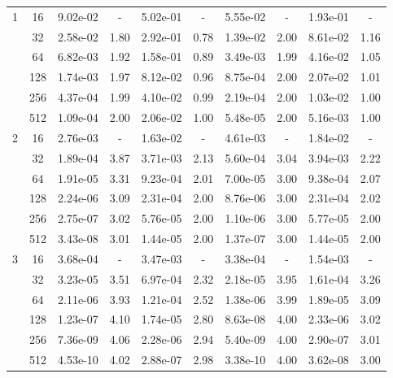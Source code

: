 \begin{table}[htbp]
\begin{center}
\begin{tabular}{| c | c | c c | c c | c c | c c |}
			\hline

			1	& 16 & 9.02e-02 & - & 5.02e-01 & - & 5.55e-02 & - & 1.93e-01 & - \\
				& 32 & 2.58e-02 & 1.80 & 2.92e-01 & 0.78 & 1.39e-02 & 2.00 & 8.61e-02 & 1.16 \\
				& 64 & 6.82e-03 & 1.92 & 1.58e-01 & 0.89 & 3.49e-03 & 1.99 & 4.16e-02 & 1.05 \\
				& 128 & 1.74e-03 & 1.97 & 8.12e-02 & 0.96 & 8.75e-04 & 2.00 & 2.07e-02 & 1.01 \\
				& 256 & 4.37e-04 & 1.99 & 4.10e-02 & 0.99 & 2.19e-04 & 2.00 & 1.03e-02 & 1.00 \\
				& 512 & 1.09e-04 & 2.00 & 2.06e-02 & 1.00 & 5.48e-05 & 2.00 & 5.16e-03 & 1.00 \\

			\hline

			2	& 16 & 2.76e-03 & - & 1.63e-02 & - & 4.61e-03 & - & 1.84e-02 & - \\
				& 32 & 1.89e-04 & 3.87 & 3.71e-03 & 2.13 & 5.60e-04 & 3.04 & 3.94e-03 & 2.22 \\
				& 64 & 1.91e-05 & 3.31 & 9.23e-04 & 2.01 & 7.00e-05 & 3.00 & 9.38e-04 & 2.07 \\
				& 128 & 2.24e-06 & 3.09 & 2.31e-04 & 2.00 & 8.76e-06 & 3.00 & 2.31e-04 & 2.02 \\
				& 256 & 2.75e-07 & 3.02 & 5.76e-05 & 2.00 & 1.10e-06 & 3.00 & 5.77e-05 & 2.00 \\
				& 512 & 3.43e-08 & 3.01 & 1.44e-05 & 2.00 & 1.37e-07 & 3.00 & 1.44e-05 & 2.00 \\

			\hline

			3	& 16 & 3.68e-04 & - & 3.47e-03 & - & 3.38e-04 & - & 1.54e-03 & - \\
				& 32 & 3.23e-05 & 3.51 & 6.97e-04 & 2.32 & 2.18e-05 & 3.95 & 1.61e-04 & 3.26 \\
				& 64 & 2.11e-06 & 3.93 & 1.21e-04 & 2.52 & 1.38e-06 & 3.99 & 1.89e-05 & 3.09 \\
				& 128 & 1.23e-07 & 4.10 & 1.74e-05 & 2.80 & 8.63e-08 & 4.00 & 2.33e-06 & 3.02 \\
				& 256 & 7.36e-09 & 4.06 & 2.28e-06 & 2.94 & 5.40e-09 & 4.00 & 2.90e-07 & 3.01 \\
				& 512 & 4.53e-10 & 4.02 & 2.88e-07 & 2.98 & 3.38e-10 & 4.00 & 3.62e-08 & 3.00 \\

			\hline


\end{tabular}
\end{center}
\end{table}

